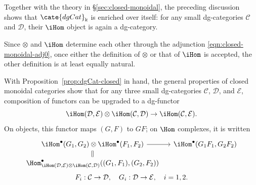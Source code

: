 Together with the theory in \S\ref{sec:closed-monoidal}, the preceding
discussion shows that $\cate{dgCat}_{\Bbbk}$ is enriched over itself: for any
small dg-categories $\mathcal{C}$ and $\mathcal{D}$, their $\iHom$ object is
again a dg-category.

Since $\otimes$ and $\iHom$ determine each other through the adjunction
\eqref{eqn:closed-monoidal-adj0}, once either the definition of $\otimes$ or
that of $\iHom$ is accepted, the other definition is at least equally
natural.

\begin{remark}
	With Proposition~\ref{prop:dgCat-closed} in hand, the general properties of
	closed monoidal categories show that for any three small dg-categories
	$\mathcal{C}$, $\mathcal{D}$, and $\mathcal{E}$, composition of functors
	can be upgraded to a dg-functor
	\[ \iHom(\mathcal{D}, \mathcal{E}) \otimes \iHom(\mathcal{C}, \mathcal{D}) \to \iHom(\mathcal{C}, \mathcal{E}). \]
	On objects, this functor maps $(G,F)$ to $GF$; on $\Hom$ complexes, it is
	written
	\begin{equation}\begin{gathered}\label{eqn:dgCat-fct-compose}
		\begin{tikzcd}[row sep=small, column sep=small]
			\iHom^\bullet(G_1, G_2) \otimes \iHom^\bullet(F_1, F_2) \arrow[r] \arrow[equal, d] & \iHom^\bullet(G_1 F_1, G_2 F_2) \\
			\Hom^\bullet_{ \iHom(\mathcal{D}, \mathcal{E}) \otimes \iHom(\mathcal{C}, \mathcal{D}) }((G_1, F_1), (G_2, F_2)) &
		\end{tikzcd} \\
		F_i: \mathcal{C} \to \mathcal{D}, \quad G_i: \mathcal{D} \to \mathcal{E}, \quad i = 1, 2 .
	\end{gathered}\end{equation}


\end{remark}
